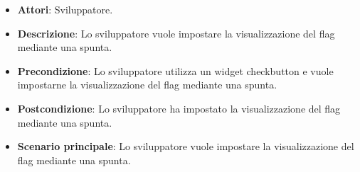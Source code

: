 
\FloatBarrier
\begin{itemize}
\item\textbf{Attori}: Sviluppatore.
\item\textbf{Descrizione}: Lo sviluppatore vuole impostare la visualizzazione del flag mediante una spunta.
\item\textbf{Precondizione}: Lo sviluppatore utilizza un widget checkbutton e vuole impostarne la visualizzazione del flag mediante una spunta.
\item\textbf{Postcondizione}: Lo sviluppatore ha impostato la visualizzazione del flag mediante una spunta.
\item\textbf{Scenario principale}: Lo sviluppatore vuole impostare la visualizzazione del flag mediante una spunta.
\end{itemize}
